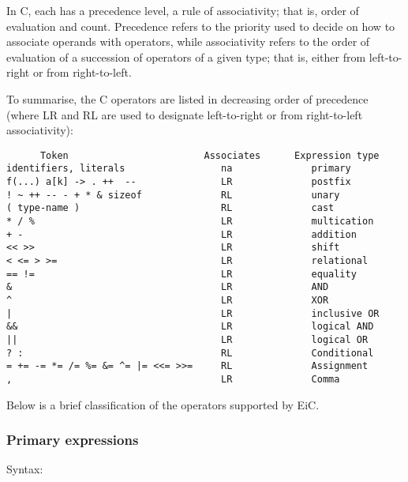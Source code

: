 In C, each  has a precedence level, a rule of
associativity; that is, order of evaluation and  count.
Precedence refers to the priority used to decide on how to associate
operands with operators, while associativity refers to the order
of evaluation of a succession of operators of a given type; that is,
either from left-to-right or from right-to-left.


To summarise, the C operators are listed in decreasing order of
precedence (where LR and RL are used to designate left-to-right or
from right-to-left associativity):

\begin{production}
\begin{verbatim}
      Token                        Associates      Expression type
identifiers, literals                 na              primary
f(...) a[k] -> . ++  --               LR              postfix
! ~ ++ -- - + * & sizeof              RL              unary         
( type-name )                         RL              cast
* / %                                 LR              multication
+ -                                   LR              addition  
<< >>                                 LR              shift       
< <= > >=                             LR              relational       
== !=                                 LR              equality       
&                                     LR              AND       
^                                     LR              XOR
|                                     LR              inclusive OR
&&                                    LR              logical AND       
||                                    LR              logical OR       
? :                                   RL              Conditional       
= += -= *= /= %= &= ^= |= <<= >>=     RL              Assignment       
,                                     LR              Comma       
\end{verbatim}
\end{production}

Below is a brief classification of the operators supported by
EiC.


\subsubsection{Primary expressions}
\label{sec:PrimaryExpression}

Syntax:

\begin{production}
\end{production}


